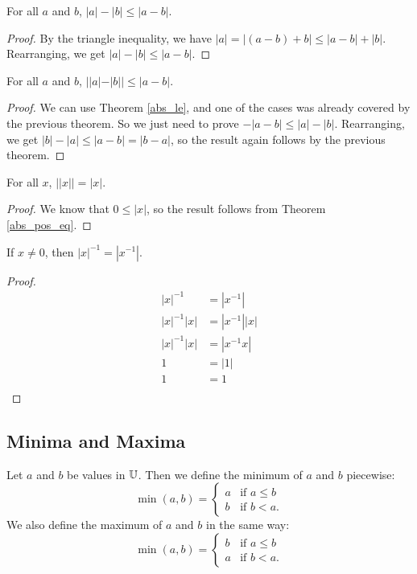 \documentclass[../../math.tex]{subfiles}
\begin{document}
\begin{theorem}
    For all $a$ and $b$, $|a| - |b| \leq |a - b|$.
\end{theorem}
\begin{proof}
    By the triangle inequality, we have $|a| = |(a - b) + b| \leq |a - b| +
    |b|$.  Rearranging, we get $|a| - |b| \leq |a - b|$.
\end{proof}

\begin{theorem}
    For all $a$ and $b$, $||a| - |b|| \leq |a - b|$.
\end{theorem}
\begin{proof}
    We can use Theorem \ref{abs_le}, and one of the cases was already covered by
    the previous theorem.  So we just need to prove $-|a - b| \leq |a| - |b|$.
    Rearranging, we get $|b| - |a| \leq |a - b| = |b - a|$, so the result again
    follows by the previous theorem.
\end{proof}

\begin{theorem}
    For all $x$, $||x|| = |x|$.
\end{theorem}
\begin{proof}
    We know that $0 \leq |x|$, so the result follows from Theorem
    \ref{abs_pos_eq}.
\end{proof}

\begin{theorem}
    If $x \neq 0$, then $|x|^{-1} = |x^{-1}|$.
\end{theorem}
\begin{proof}
    \begin{align*}
        |x|^{-1} &= |x^{-1}| \\
        |x|^{-1} |x| &= |x^{-1}| |x| \\
        |x|^{-1} |x| &= |x^{-1}x| \\
        1 &= |1| \\
        1 &= 1 \\
    \end{align*}
\end{proof}

\subsection{Minima and Maxima}

\begin{definition}
    Let $a$ and $b$ be values in $\mathbb{U}$.  Then we define the minimum of $a$ and
    $b$ piecewise:
    \[
        \min(a, b) = \begin{cases}
            a & \text{if $a \leq b$} \\
            b & \text{if $b < a$.}
        \end{cases}
    \]
    We also define the maximum of $a$ and $b$ in the same way:
    \[
        \min(a, b) = \begin{cases}
            b & \text{if $a \leq b$} \\
            a & \text{if $b < a$.}
        \end{cases}
    \]
\end{definition}
\end{document}
